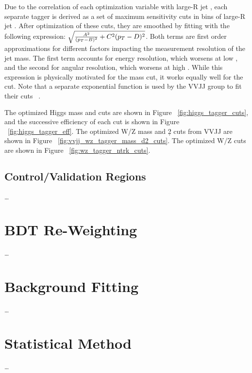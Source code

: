 Due to the correlation of each optimization variable with large-R jet \pt, each separate tagger is derived as a set of maximum sensitivity cuts in bins of large-R jet \pt.
After optimization of these cuts, they are smoothed by fitting with the following expression: $\sqrt{\frac{A^2}{(p_{T}-B)^2} + C^2(p_{T}-D)^2}$.
Both terms are first order approximations for different factors impacting the measurement resolution of the jet mass.
The first term accounts for energy resolution, which worsens at low \pt, and the second for angular resolution, which worsens at high \pt.
While this expression is physically motivated for the mass cut, it works equally well for the \ntrk cut.
Note that a separate exponential function is used by the VVJJ group to fit their \ntrk cuts ~\cite{VVJJSupport2019}.

The optimized Higgs mass and \ntrk cuts are shown in Figure ~\ref{fig:higgs_tagger_cuts}, and the successive efficiency of each cut is shown in Figure ~\ref{fig:higgs_tagger_eff}.
The optimized W/Z mass and \d2 cuts from VVJJ are shown in Figure ~\ref{fig:vvjj_wz_tagger_mass_d2_cuts}.
The optimized W/Z \ntrk cuts are shown in Figure ~\ref{fig:wz_tagger_ntrk_cuts}.


\subsection{Control/Validation Regions}
\dots

\section{BDT Re-Weighting}
\dots

\section{Background Fitting}
\dots

\section{Statistical Method}
\dots

